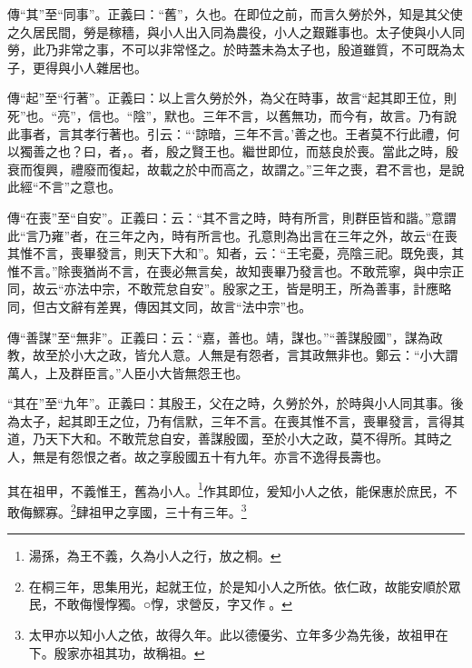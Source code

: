 {\noindent\zhuan{}\fzbyks 傳“其”至“同事”。正義曰：“舊”，久也。在即位之前，而言久勞於外，知是其父使之久居民間，勞是稼穡，與小人出入同為農役，小人之艱難事也。太子使與小人同勞，此乃非常之事，不可以非常怪之。於時蓋未為太子也，殷道雖質，不可既為太子，更得與小人雜居也。 \par}

{\noindent\zhuan{}\fzbyks 傳“起”至“行著”。正義曰：以上言久勞於外，為父在時事，故言“起其即王位，則死”也。“亮”，信也。“陰”，默也。三年不言，以舊無功，而今有，故言。乃有說此事者，言其孝行著也。引云：“‘諒暗，三年不言。’善之也。王者莫不行此禮，何以獨善之也？曰，者，。者，殷之賢王也。繼世即位，而慈良於喪。當此之時，殷衰而復興，禮廢而復起，故載之於中而高之，故謂之。”三年之喪，君不言也，是說此經“不言”之意也。 \par}

{\noindent\zhuan{}\fzbyks 傳“在喪”至“自安”。正義曰：云：“其不言之時，時有所言，則群臣皆和諧。”意謂此“言乃雍”者，在三年之內，時有所言也。孔意則為出言在三年之外，故云“在喪其惟不言，喪畢發言，則天下大和”。知者，云：“王宅憂，亮陰三祀。既免喪，其惟不言。”除喪猶尚不言，在喪必無言矣，故知喪畢乃發言也。不敢荒寧，與中宗正同，故云“亦法中宗，不敢荒怠自安”。殷家之王，皆是明王，所為善事，計應略同，但古文辭有差異，傳因其文同，故言“法中宗”也。 \par}

{\noindent\zhuan{}\fzbyks 傳“善謀”至“無非”。正義曰：云：“嘉，善也。靖，謀也。”“善謀殷國”，謀為政教，故至於小大之政，皆允人意。人無是有怨者，言其政無非也。鄭云：“小大謂萬人，上及群臣言。”人臣小大皆無怨王也。 \par}

{\noindent\shu{}\fzkt “其在”至“九年”。正義曰：其殷王，父在之時，久勞於外，於時與小人同其事。後為太子，起其即王之位，乃有信默，三年不言。在喪其惟不言，喪畢發言，言得其道，乃天下大和。不敢荒怠自安，善謀殷國，至於小大之政，莫不得所。其時之人，無是有怨恨之者。故之享殷國五十有九年。亦言不逸得長壽也。 \par}

其在祖甲，不義惟王，舊為小人。\footnote{湯孫，為王不義，久為小人之行，放之桐。}作其即位，爰知小人之依，能保惠於庶民，不敢侮鰥寡。\footnote{在桐三年，思集用光，起就王位，於是知小人之所依。依仁政，故能安順於眾民，不敢侮慢惸獨。○惸，求營反，字又作𦬮。}肆祖甲之享國，三十有三年。\footnote{太甲亦以知小人之依，故得久年。此以德優劣、立年多少為先後，故祖甲在下。殷家亦祖其功，故稱祖。}



